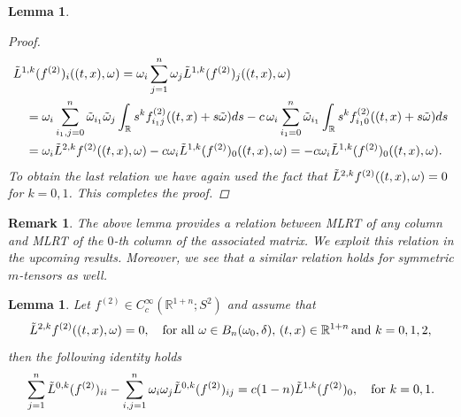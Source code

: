 \documentclass[11pt,a4paper,reqno]{amsart}
\newtheorem{lemma}[definition]{Lemma}
\newtheorem{remark}[definition]{Remark}
\newcommand{\R}{\mathbb{R}}
\newcommand{\Bdl}{B_{n}(\omega_0,\delta)}
\newcommand{\om}{\omega}
\begin{document}
\begin{lemma}
\begin{proof}
\begin{equation*}
				\begin{aligned}
				&	\Tilde{L}^{1,k}(f^{(2)})_i((t,x),\om)=\omega_i \sum_{j=1}^{n}\omega_{j}\Tilde{L}^{1,k}(f^{(2)})_{j}((t,x),\om)\\
					&\quad=\om_i\sum_{i_1,j=0}^n\tilde{\om}_{i_1}\tilde{\om}_j\int_{\R}s^k f^{(2)}_{i_1j}((t,x)+s\tilde{\om})ds - c\, \om_{i}\sum_{i_1=0}^n\tilde{\om}_{i_1}\int_{\R}s^kf^{(2)}_{i_10}((t,x)+s\tilde{\om})ds\\
					&\quad=\om_i \tilde{L}^{2,k}f^{(2)}((t,x),\om)-c\om_i \tilde{L}^{1,k}(f^{(2)})_0((t,x),\om)= -c\om_i \tilde{L}^{1,k}(f^{(2)})_0((t,x),\om).
				\end{aligned}
			\end{equation*} 
			To obtain the last relation we have again used the fact that $ \Tilde{L}^{2,k}f^{(2)}((t,x),\om)=0$ for $k=0,1$. This completes the proof.
		\end{proof}
	\end{lemma}
	\begin{remark}
		The above lemma provides a relation between MLRT of any column and MLRT of the $0$-th column of the associated matrix. We exploit this relation in the upcoming results. Moreover, we see that a similar relation holds for symmetric $m$-tensors as well.
	\end{remark}
	\begin{lemma}\label{preresult_1}
		Let  $f^{(2)}\in C_{c}^{\infty}(\mathbb{R}^{1+n};S^2)$ and assume that 	
        \[
		\Tilde{L}^{2,k}f^{(2)}((t,x),\omega)=0, \quad\text{for all } \omega \in \Bdl,\, (t,x) \in \mathbb{R}^{1+n} \, \text{and } k=0,1,2,
		\]
		then the following identity holds
		\begin{equation}
			\sum_{j=1}^{n}\Tilde{L}^{0,k}(f^{(2)})_{ii}-\sum_{i,j=1}^{n}\omega_{i} \omega_{j}\Tilde{L}^{0,k}(f^{(2)})_{ij}=c(1-n)\Tilde{L}^{1,k}(f^{(2)})_0, \quad\text{for } k=0,1.
		\end{equation}
	\end{lemma}
\end{document}
